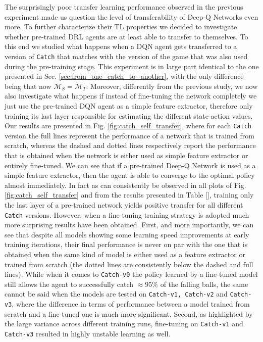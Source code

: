 The surprisingly poor transfer learning performance observed in the previous experiment made us question the level of transferability of Deep-Q Networks even more. To further characterize their TL properties we decided to investigate whether pre-trained DRL agents are at least able to transfer to themselves. To this end we studied what happens when a DQN agent gets transferred to a version of \texttt{Catch} that matches with the version of the game that was also used during the pre-training stage. This experiment is in large part identical to the one presented in Sec. \ref{sec:from_one_catch_to_another}, with the only difference being that now $\mathcal{M}_S = \mathcal{M}_T$. Moreover, differently from the previous study, we now also investigate what happens if instead of fine-tuning the network completely we just use the pre-trained DQN agent as a simple feature extractor, therefore only training its last layer responsible for estimating the different state-action values. Our results are presented in Fig. \ref{fig:catch_self_transfer}, where for each \texttt{Catch} version the full lines represent the performance of a network that is trained from scratch, whereas the dashed and dotted lines respectively report the performance that is obtained when the network is either used as simple feature extractor or entirely fine-tuned. We can see that if a pre-trained Deep-Q Network is used as a simple feature extractor, then the agent is able to converge to the optimal policy almost immediately. In fact as can consistently be observed in all plots of Fig. \ref{fig:catch_self_transfer} and from the results presented in Table \ref{}, training only the last layer of a pre-trained network yields positive transfer for all different \texttt{Catch} versions. However, when a fine-tuning training strategy is adopted much more surprising results have been obtained. First, and more importantly, we can see that despite all models showing some learning speed improvements at early training iterations, their final performance is never on par with the one that is obtained when the same kind of model is either used as a feature extractor or trained from scratch (the dotted lines are consistently below the dashed and full lines). While when it comes to \texttt{Catch-v0} the policy learned by a fine-tuned model still allows the agent to successfully catch $\approx 95\%$ of the falling balls, the same cannot be said when the models are tested on \texttt{Catch-v1, Catch-v2} and \texttt{Catch-v3}, where the difference in terms of performance between a model trained from scratch and a fine-tuned one is much more significant. Second, as highlighted by the large variance across different training runs, fine-tuning on \texttt{Catch-v1} and \texttt{Catch-v3} resulted in highly unstable learning as well.    


